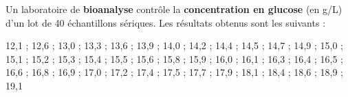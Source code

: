 \documentclass[11pt,a4paper]{article}
\newcommand{\dataS}{%
12{,}1 ; 12{,}6 ; 13{,}0 ; 13{,}3 ; 13{,}6 ; 13{,}9 ; 14{,}0 ; 14{,}2 ;
14{,}4 ; 14{,}5 ; 14{,}7 ; 14{,}9 ; 15{,}0 ; 15{,}1 ; 15{,}2 ; 15{,}3 ;
15{,}4 ; 15{,}5 ; 15{,}6 ; 15{,}8 ; 15{,}9 ; 16{,}0 ; 16{,}1 ; 16{,}3 ;
16{,}4 ; 16{,}5 ; 16{,}6 ; 16{,}8 ; 16{,}9 ; 17{,}0 ; 17{,}2 ; 17{,}4 ;
17{,}5 ; 17{,}7 ; 17{,}9 ; 18{,}1 ; 18{,}4 ; 18{,}6 ; 18{,}9 ; 19{,}1}
\begin{document}
\vspace{0.3cm}

\newpage

\begin{tcolorbox}[colback=bioyellow,colframe=bioaccent,title={\textbf{Contexte commun à toutes les épreuves}},fonttitle=\bfseries]
Un laboratoire de \textbf{bioanalyse} contrôle la \textbf{concentration en glucose} (en g/L) d'un lot de 40 échantillons sériques. Les résultats obtenus sont les suivants :

\vspace{0.2cm}
\centering
\begin{minipage}{0.95\linewidth}
\small\dataS
\end{minipage}
\end{tcolorbox}

\vspace{0.2cm}
\end{document}
